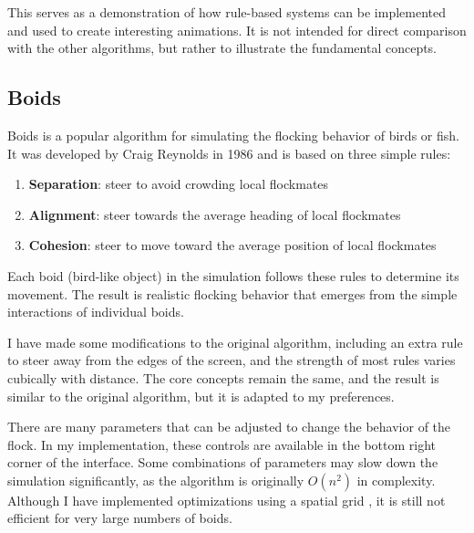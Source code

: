 
This serves as a demonstration of how rule-based systems can be implemented and used to create interesting animations. It is not intended for direct comparison with the other algorithms, but rather to illustrate the fundamental concepts.

\subsection{Boids}
\label{subsec:boids}

Boids is a popular algorithm for simulating the flocking behavior of birds or fish. It was developed by Craig Reynolds in 1986 \cite{boids} and is based on three simple rules:
\begin{enumerate}
    \item \textbf{Separation}: steer to avoid crowding local flockmates
    \item \textbf{Alignment}: steer towards the average heading of local flockmates
    \item \textbf{Cohesion}: steer to move toward the average position of local flockmates
\end{enumerate}

Each boid (bird-like object) in the simulation follows these rules to determine its movement. The result is realistic flocking behavior that emerges from the simple interactions of individual boids.

\begin{Note}
    I have made some modifications to the original algorithm, including an extra rule to steer away from the edges of the screen, and the strength of most rules varies cubically with distance. The core concepts remain the same, and the result is similar to the original algorithm, but it is adapted to my preferences.
\end{Note}


There are many parameters that can be adjusted to change the behavior of the flock. In my implementation, these controls are available in the bottom right corner of the interface. Some combinations of parameters may slow down the simulation significantly, as the algorithm is originally \(O(n^2)\) in complexity. Although I have implemented optimizations using a spatial grid \cite{spatial-grid}, it is still not efficient for very large numbers of boids.

